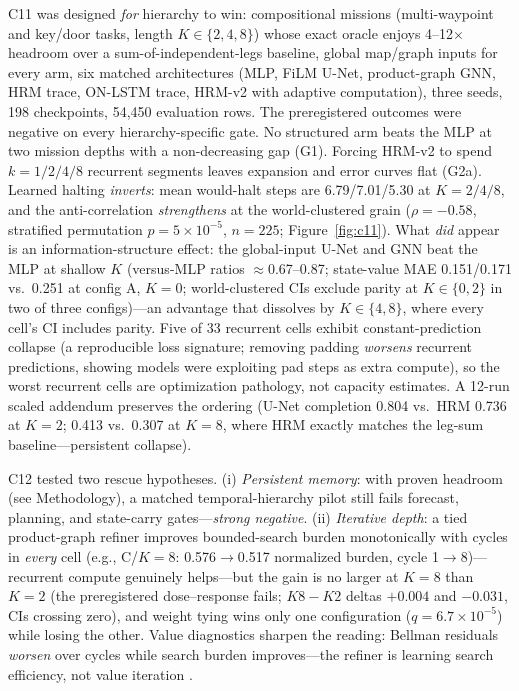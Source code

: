\documentclass[letterpaper]{article} %
\newcommand{\stage}[1]{\textsc{#1}}
\begin{document}
\stage{C11} was designed \emph{for} hierarchy to win: compositional missions (multi-waypoint and key/door tasks, length $K\in\{2,4,8\}$) whose exact oracle enjoys 4--12$\times$ headroom over a sum-of-independent-legs baseline, global map/graph inputs for every arm, six matched architectures (MLP, FiLM U-Net, product-graph GNN, HRM trace, ON-LSTM trace, HRM-v2 with adaptive computation), three seeds, 198 checkpoints, 54{,}450 evaluation rows. The preregistered outcomes were negative on every hierarchy-specific gate. No structured arm beats the MLP at two mission depths with a non-decreasing gap (G1). Forcing HRM-v2 to spend $k{=}1/2/4/8$ recurrent segments leaves expansion and error curves flat (G2a). Learned halting \emph{inverts}: mean would-halt steps are 6.79/7.01/5.30 at $K{=}2/4/8$, and the anti-correlation \emph{strengthens} at the world-clustered grain ($\rho{=}-0.58$, stratified permutation $p{=}5{\times}10^{-5}$, $n{=}225$; Figure~\ref{fig:c11}). What \emph{did} appear is an information-structure effect: the global-input U-Net and GNN beat the MLP at shallow $K$ (versus-MLP ratios $\approx$0.67--0.87; state-value MAE 0.151/0.171 vs.\ 0.251 at config A, $K{=}0$; world-clustered CIs exclude parity at $K\in\{0,2\}$ in two of three configs)---an advantage that dissolves by $K\in\{4,8\}$, where every cell's CI includes parity. Five of 33 recurrent cells exhibit constant-prediction collapse (a reproducible loss signature; removing padding \emph{worsens} recurrent predictions, showing models were exploiting pad steps as extra compute), so the worst recurrent cells are optimization pathology, not capacity estimates. A 12-run scaled addendum preserves the ordering (U-Net completion 0.804 vs.\ HRM 0.736 at $K{=}2$; 0.413 vs.\ 0.307 at $K{=}8$, where HRM exactly matches the leg-sum baseline---persistent collapse).

\stage{C12} tested two rescue hypotheses. (i) \emph{Persistent memory}: with proven headroom (see Methodology), a matched temporal-hierarchy pilot still fails forecast, planning, and state-carry gates---\emph{strong negative}. (ii) \emph{Iterative depth}: a tied product-graph refiner improves bounded-search burden monotonically with cycles in \emph{every} cell (e.g., C/$K{=}8$: 0.576$\to$0.517 normalized burden, cycle 1$\to$8)---recurrent compute genuinely helps---but the gain is no larger at $K{=}8$ than $K{=}2$ (the preregistered dose--response fails; $K8{-}K2$ deltas $+0.004$ and $-0.031$, CIs crossing zero), and weight tying wins only one configuration ($q{=}6.7{\times}10^{-5}$) while losing the other. Value diagnostics sharpen the reading: Bellman residuals \emph{worsen} over cycles while search burden improves---the refiner is learning search efficiency, not value iteration \citep[cf.][]{tamar2016vin,lee2018gppn}.
\end{document}
